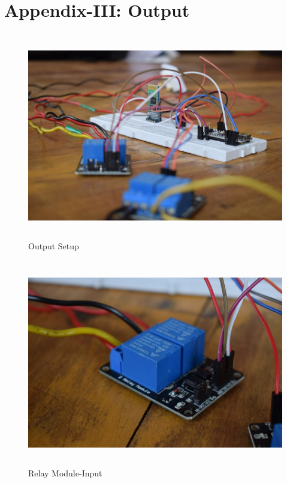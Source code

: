 \section{Appendix-III: Output}
\begin{figure}[H]
	
	\centering
	\includegraphics[width=\linewidth,height=9cm] {./images/p28.jpg}
	\caption{Output Setup}
	\label{manual}
\end{figure}

\begin{figure}[H]
	
	\centering
	\includegraphics[width=\linewidth,height=9cm] {./images/p29.jpg}
	\caption{Relay Module-Input}
	\label{manual}
\end{figure}

